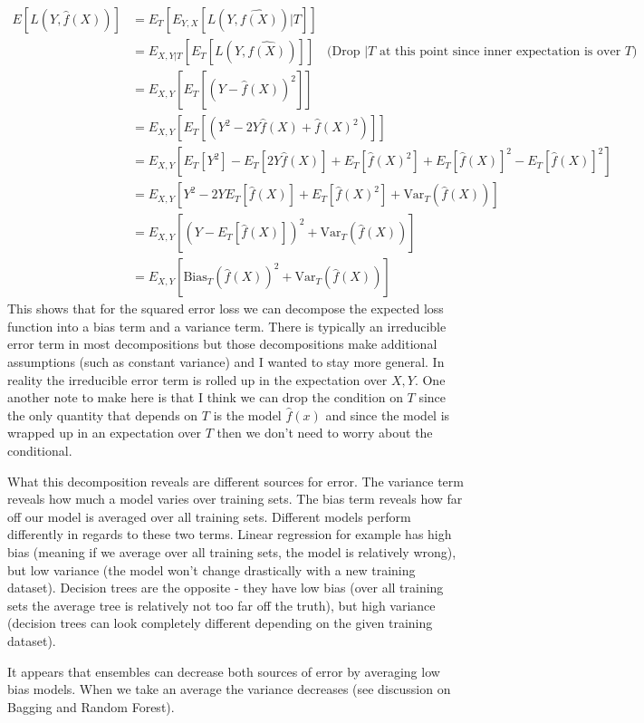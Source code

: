 \documentclass[paper=a4, fontsize=11pt]{scrartcl} %
\numberwithin{equation}{section} %
\numberwithin{figure}{section} %
\numberwithin{table}{section} %
\begin{document}
\begin{equation}
\begin{split}
E[L(Y, \hat{f}(X))] & = E_{T}[E_{Y,X}[L(Y, \hat{f(X)})|T]] \\
&= E_{X,Y|T}[E_{T}[L(Y, \hat{f(X)})]]  \quad \text{(Drop $|T$ at this point since inner expectation is over $T$)}\\
&= E_{X,Y}[E_{T}[(Y - \hat{f}(X))^2]] \\
&= E_{X,Y}[E_{T}[(Y^2 - 2Y\hat{f}(X) + \hat{f}(X)^2)]] \\
&= E_{X,Y}[E_{T}[Y^2] - E_{T}[2Y\hat{f}(X)] + E_{T}[\hat{f}(X)^2] + E_{T}[\hat{f}(X)]^2 - E_{T}[\hat{f}(X)]^2]\\
&= E_{X,Y}[Y^2 -  2YE_{T}[\hat{f}(X)] + E_{T}[\hat{f}(X)^2] + \text{Var}_{T}(\hat{f}(X))]\\
&=E_{X,Y}[(Y - E_{T}[\hat{f}(X)])^2 + \text{Var}_{T}(\hat{f}(X))] \\
&= E_{X,Y}[\text{Bias}_{T}(\hat{f}(X))^2 + \text{Var}_{T}(\hat{f}(X))] 
\end{split}
\end{equation}
This shows that for the squared error loss we can decompose the expected loss function into a bias term and a variance term. There is typically an irreducible error term in most decompositions but those decompositions make additional assumptions (such as constant variance) and I wanted to stay more general. In reality the irreducible error term is rolled up in the expectation over $X,Y$. One another note to make here is that I think we can drop the condition on $T$ since the only quantity that depends on $T$ is the model $\hat{f}(x)$ and since the model is wrapped up in an expectation over $T$ then we don't need to worry about the conditional.

What this decomposition reveals are different sources for error. The variance term reveals how much a model varies over training sets. The bias term reveals how far off our model is averaged over all training sets. Different models perform differently in regards to these two terms. Linear regression for example has high bias (meaning if we average over all training sets, the model is relatively wrong), but low variance (the model won't change drastically with a new training dataset). Decision trees are the opposite - they have low bias (over all training sets the average tree is relatively not too far off the truth), but high variance (decision trees can look completely different depending on the given training dataset).

It appears that ensembles can decrease both sources of error by averaging low bias models. When we take an average the variance decreases (see discussion on Bagging and Random Forest).
\end{document}
